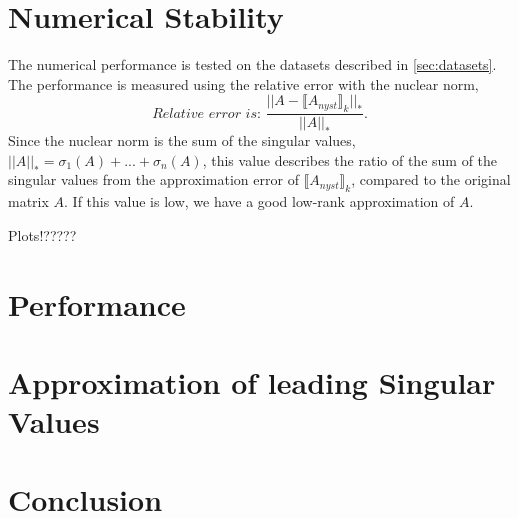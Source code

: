 \documentclass{article}
\theoremstyle{definition}
\begin{document}
\section{Numerical Stability}

The numerical performance is tested on the datasets described in \ref{sec:datasets}. The performance is measured using the relative error with the nuclear norm,
\begin{equation}
    \textit{Relative error is: } \frac{||A-\llbracket A_{nyst}\rrbracket_k||_*}{||A||_*}.
\end{equation}
Since the nuclear norm is the sum of the singular values, $||A||_*=\sigma_1(A)+...+\sigma_n(A)$, this value describes the ratio of the sum of the singular values from the approximation error of $\llbracket A_{nyst}\rrbracket_k$, compared to the original matrix $A$. If this value is low, we have a good low-rank approximation of $A$.

Plots!?????

\section{Performance}


\section{Approximation of leading Singular Values}


\section{Conclusion}

\clearpage
\begin{appendices}
\end{appendices}

\printbibliography{} %
\end{document}
